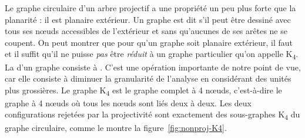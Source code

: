 {    Le graphe circulaire d’un arbre projectif a une propriété un peu plus forte que la planarité : il est planaire extérieur. Un graphe est dit  s’il peut être dessiné avec tous ses nœuds accessibles de l’extérieur et sans qu’aucunes de ses arêtes ne se coupent. On peut montrer que pour qu’un graphe soit planaire extérieur, il faut et il suffit qu’il ne puisse \textit{pas} être \textit{réduit} à un graphe particulier qu’on appelle K\textsubscript{4}. La  d’un graphe consiste à . C’est une opération importante de notre point de vue, car elle consiste à diminuer la granularité de l'analyse en considérant des unités plus grossières. Le graphe K\textsubscript{4} est le graphe complet à 4 nœuds, c’est-à-dire le graphe à 4 nœuds où tous les nœuds sont liés deux à deux. Les deux configurations rejetées par la projectivité sont exactement des sous-graphes K\textsubscript{4} du graphe circulaire, comme le montre la figure~\ref{fig:nonproj-K4}.
   
}
